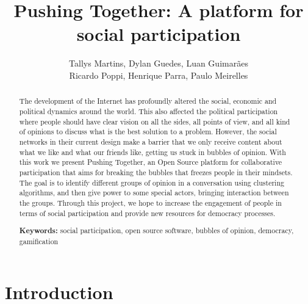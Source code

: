 \documentclass{llncs}
\begin{document}
\sloppy
\title{Pushing Together: A platform for social participation}

\author{Tallys Martins, Dylan Guedes, Luan Guimarães\\
        Ricardo Poppi, Henrique Parra, Paulo Meirelles}



\maketitle
\begin{abstract}

The development of the Internet has profoundly altered the social, economic
and political dynamics around the world. This also affected the political
participation where people should have clear
vision on all the sides, all points of view, and all kind of opinions to
discuss what is the best solution to a problem. However, the social networks
in their current design make a barrier that we only receive content about what
we like and what our friends like, getting us stuck in bubbles of opinion.  With this work we present Pushing
Together, an Open Source platform for collaborative participation that aims for
breaking the bubbles that freezes people in their mindsets. The goal is to
identify different groups of opinion in a conversation using clustering
algorithms, and then give power to some special actors, bringing interaction
between the groups. Through this project, we hope to increase the engagement of
people in terms of social participation and provide new resources for democracy
processes.

\textbf{Keywords:} social participation, open source software, bubbles of
opinion, democracy, gamification
\end{abstract}

\section{Introduction}
\label{sec:intro}
\end{document}

